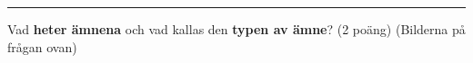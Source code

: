 \documentclass{exam}
\begin{document}
\begin{questions}
\vspace{5mm} 
\hrule 
\vspace{5mm} 

\question Vad \textbf{heter ämnena} och vad kallas den \textbf{typen av ämne}? (2 poäng) (Bilderna på frågan ovan)


\end{questions}
\end{document}

